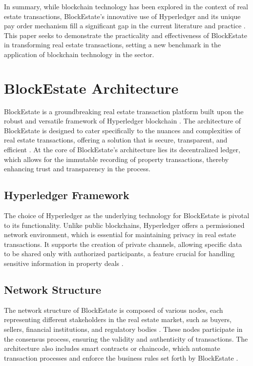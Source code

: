 \documentclass[3p,times]{elsarticle}
\begin{document}
In summary, while blockchain technology has been explored in the context of real estate transactions, BlockEstate’s innovative use of Hyperledger and its unique pay order mechanism fill a significant gap in the current literature and practice \cite{nijland2019influence}. This paper seeks to demonstrate the practicality and effectiveness of BlockEstate in transforming real estate transactions, setting a new benchmark in the application of blockchain technology in the sector.

\section{BlockEstate Architecture}

BlockEstate is a groundbreaking real estate transaction platform built upon the robust and versatile framework of Hyperledger blockchain \cite{bhanushali2020blockchain}. The architecture of BlockEstate is designed to cater specifically to the nuances and complexities of real estate transactions, offering a solution that is secure, transparent, and efficient \cite{konashevych2020general}. At the core of BlockEstate's architecture lies its decentralized ledger, which allows for the immutable recording of property transactions, thereby enhancing trust and transparency in the process.

\subsection{Hyperledger Framework}
The choice of Hyperledger as the underlying technology for BlockEstate is pivotal to its functionality. Unlike public blockchains, Hyperledger offers a permissioned network environment, which is essential for maintaining privacy in real estate transactions. It supports the creation of private channels, allowing specific data to be shared only with authorized participants, a feature crucial for handling sensitive information in property deals \cite{krupa2019reshaping}.

\subsection{Network Structure}
The network structure of BlockEstate is composed of various nodes, each representing different stakeholders in the real estate market, such as buyers, sellers, financial institutions, and regulatory bodies \cite{ferreira2021blockchain}. These nodes participate in the consensus process, ensuring the validity and authenticity of transactions. The architecture also includes smart contracts or chaincode, which automate transaction processes and enforce the business rules set forth by BlockEstate \cite{hoxha2019study}.
\end{document}
